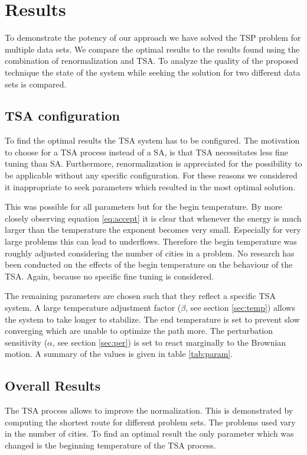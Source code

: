 \section{Results}
To demonstrate the potency of our approach we have solved the TSP problem for
multiple data sets\cite{heidel}. We compare the optimal results to the results found using
the combination of renormalization and TSA. To analyze the quality of the
proposed technique the state of the system while seeking the solution for two
different data sets is compared.

\subsection{TSA configuration}
To find the optimal results the TSA system has to be configured. The
motivation to choose for a TSA process instead of a SA, is that TSA
necessitates less fine tuning than SA. Furthermore, renormalization is 
appreciated for the possibility to be applicable without any specific
configuration. For these reasons we considered it inappropriate to seek
parameters which resulted in the most optimal solution.

This was possible for all parameters but for the begin temperature. By more
closely observing equation \eqref{eq:accept} it is clear that whenever the
energy is much larger than the temperature the exponent becomes very small.
Especially for very large problems this can lead to underflows. Therefore the
begin temperature was roughly adjusted considering the number of cities in a
problem. No research has been conducted on the effects of the begin
temperature on the behaviour of the TSA. Again, because no specific fine
tuning is considered.

The remaining parameters are chosen such that they reflect a specific TSA
system. A large temperature adjustment factor ($\beta$, see section
\ref{sec:temp}) allows the system to take longer to stabilize. The end
temperature is set to prevent slow converging which are unable to optimize the
path more. The perturbation sensitivity ($\alpha$, see section \ref{sec:per}) is set to
react marginally to the Brownian motion. A summary of the values is given in
table \ref{tab:param}.

\subsection{Overall Results}
The TSA process allows to improve the normalization. This is demonstrated by
computing the shortest route for different problem sets. The problems used vary in
the number of cities. To find an optimal result the only parameter which was
changed is the beginning temperature of the TSA process.

